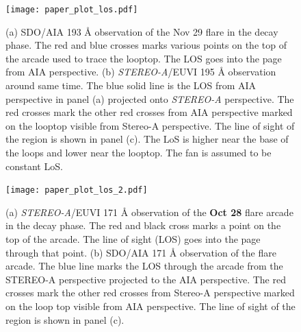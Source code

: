 
\begin{figure}[!h]
    \centering
    \texttt{[image: paper\_plot\_los.pdf]}
    \caption[LoS triangulation for the Nov 29th, 2020 flare]{(a) SDO/AIA 193 {\AA} observation of the Nov 29 flare in the decay phase. The red and blue crosses marks various points on the top of the arcade used to trace the looptop. The LOS goes into the page from AIA perspective. (b) {\it STEREO-A}/EUVI 195 {\AA} observation around same time. The blue solid line is the LOS from AIA perspective in panel (a) projected onto {\it STEREO-A} perspective. The red crosses mark the other red crosses from AIA perspective marked on the looptop visible from Stereo-A perspective. The line of sight of the region is shown in panel (c). The LoS is higher near the base of the loops and lower near the looptop. The fan is assumed to be constant LoS.}
    \label{fig:flare_orient2}
\end{figure}

\begin{figure}
    \centering
    \texttt{[image: paper\_plot\_los\_2.pdf]}
    \caption[LoS triangulation for the Oct 28th, 2021 flare]{(a) {\it STEREO-A}/EUVI 171 {\AA} observation of the {\bf Oct 28} flare arcade in the decay phase. The red and black cross marks a point on the top of the arcade. The line of sight (LOS) goes into the page through that point. (b) SDO/AIA 171 {\AA} observation of the flare arcade. The blue line marks the LOS through the arcade from the STEREO-A perspective projected to the AIA perspective. The red crosses mark the other red crosses from Stereo-A perspective marked on the loop top visible from AIA perspective. The line of sight of the region is shown in panel (c).}
    \label{fig:flare_orient}
\end{figure}

